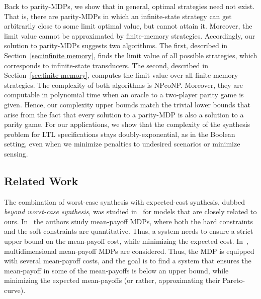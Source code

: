 \documentclass[runningheads,a4paper]{llncs}
\begin{document}
Back to parity-MDPs, we show that in general, optimal strategies need not exist. That is, there are parity-MDPs in which an infinite-state strategy can get arbitrarily close to some limit optimal value, but cannot attain it. Moreover, the limit value cannot be approximated by finite-memory strategies.  Accordingly, our solution to parity-MDPs suggests two algorithms. The first, described in Section~\ref{sec:infinite memory}, finds the limit value of all possible strategies, which corresponds to infinite-state transducers. The second, described in Section~\ref{sec:finite memory}, computes the limit value over all finite-memory strategies. 
The complexity of both algorithms is NPcoNP. Moreover, they are computable in polynomial time when an oracle to a two-player parity game is given.
Hence, our complexity upper bounds match the trivial lower bounds that arise from the fact that every solution to a parity-MDP is also a solution to a parity game.
For our applications, we show that the complexity of the synthesis problem for LTL specifications stays doubly-exponential, as in the Boolean setting, even when we minimize penalties to undesired scenarios or minimize  sensing.

\vspace*{-10pt}
\subsection{Related Work}
\label{related}
The combination of worst-case synthesis with expected-cost synthesis, dubbed {\em beyond worst-case synthesis\/}, was studied in~\cite{BFRR14a,CR15} for models that are closely related to ours. 
In~\cite{BFRR14a} the authors study mean-payoff MDPs, where both the hard constraints and the soft constraints are quantitative. Thus, a system needs to ensure a strict upper bound on the mean-payoff cost, while minimizing the expected cost. 
In~\cite{CR15}, multidimensional mean-payoff MDPs are considered. Thus, the MDP is equipped with several mean-payoff costs, and the goal is to find a system that ensures the mean-payoff in some of the mean-payoffs is below an upper bound, while minimizing the expected mean-payoffs (or rather, approximating their Pareto-curve).
 
\end{document}
